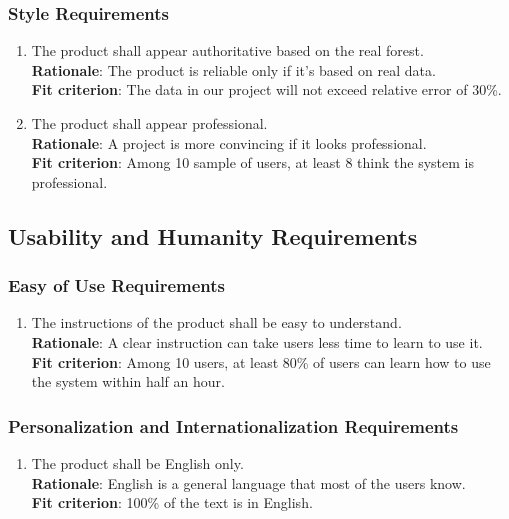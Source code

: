 \documentclass{article}
\begin{document}
\subsubsection{Style Requirements}
\begin{enumerate}[LF2.1]
    \item The product shall appear authoritative based on the real forest.\\
    \textbf{Rationale}: The product is reliable only if it's based on real data.\\
    \textbf{Fit criterion}: The data in our project will not exceed relative error of 30\%.
    
    \item The product shall appear professional.\\
    \textbf{Rationale}: A project is more convincing if it looks professional.\\
    \textbf{Fit criterion}: Among 10 sample of users, at least 8 think the system is professional.
\end{enumerate}
\subsection{Usability and Humanity Requirements}
\subsubsection{Easy of Use Requirements}
\begin{enumerate}[UH1.1]
    \item The instructions of the product shall be easy to understand.\\
    \textbf{Rationale}: A clear instruction can take users less time to learn to use it.\\
    \textbf{Fit criterion}: Among 10 users, at least 80\% of users can learn how to use the system within half an hour.
\end{enumerate}
\subsubsection{Personalization and Internationalization Requirements}
\begin{enumerate}[UH2.1]
    \item The product shall be English only.\\
    \textbf{Rationale}: English is a general language that most of the users know.\\
    \textbf{Fit criterion}: 100\% of the text is in English.
\end{enumerate}
\end{document}
